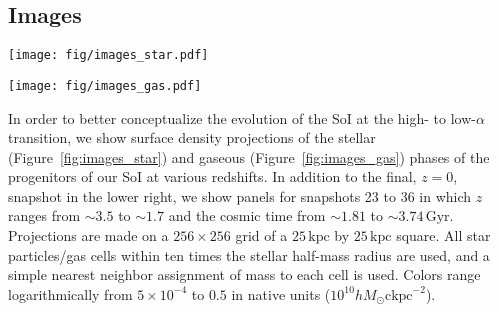 \documentclass[linenumbers, twocolumn]{aastex631}
\newcommand{\Gyr}{\ensuremath{\textrm{Gyr}}}
\newcommand{\kpc}{\ensuremath{\textrm{kpc}}}
\newcommand{\ckpc}{\ensuremath{\textrm{ckpc}}}
\begin{document}
\subsection{Images}\label{ssec:images}
\begin{figure*}
  \centering
  \texttt{[image: fig/images\_star.pdf]}
  \caption{Surface density projections of star particles in our SoI at the transition between the high- and low-$\alpha$ sequences. Each panel indicates subsequent snapshots ranging from snapshot 23 ($z\sim3.5$) to snapshot 36 ($z\sim1.7$), as well as snapshot 99 ($z=0$) in the lower right. Several key numbers are shown in the corners of each panel, clockwise from the top left: SFR, time, bar strength ($A_{2,\textrm{max}}$), and BH accretion rate. A guide is given in the top left subpanel. At the center-bottom of each panel, we indicate panels which occur before the transition ($\sim3.2\,\Gyr$) as high-$\alpha$ and panels which occur after as low-$\alpha$.}
  \label{fig:images_star}
\end{figure*}

\begin{figure*}
  \centering
  \texttt{[image: fig/images\_gas.pdf]}
  \caption{As in Figure~\ref{fig:images_star}, but showing the surface density projections of gas in our SoI at the transition between the high- and low-$\alpha$ sequences. Each panel indicates subsequent snapshots ranging from snapshot 23 ($z\sim3.5$) to snapshot 36 ($z\sim1.7$), as well as snapshot 99 ($z=0$) in the lower right. Several key numbers are shown in the corners of each panel, clockwise from the top left: SFR, time, gas fraction, and BH accretion rate. A guide is given in the top left subpanel. At the center-bottom of each panel, we indicate panels which occur before the transition ($\sim3.2\,\Gyr$) as high-$\alpha$ and panels which occur after as low-$\alpha$.}
  \label{fig:images_gas}
\end{figure*}

In order to better conceptualize the evolution of the SoI at the high- to low-$\alpha$ transition, we show surface density projections of the stellar (Figure~\ref{fig:images_star}) and gaseous (Figure~\ref{fig:images_gas}) phases of the progenitors of our SoI at various redshifts. In addition to the final, $z=0$, snapshot in the lower right, we show panels for snapshots 23 to 36 in which $z$ ranges from $\sim3.5$ to $\sim1.7$ and the cosmic time from $\sim1.81$ to $\sim3.74\,\Gyr$. Projections are made on a $256\times256$ grid of a $25\,\kpc$ by $25\,\kpc$ square. All star particles/gas cells within ten times the stellar half-mass radius are used, and a simple nearest neighbor assignment of mass to each cell is used. Colors range logarithmically from $5\times10^{-4}$ to $0.5$ in native units ($10^{10} h M_{\odot} \ckpc^{-2}$).
\end{document}
